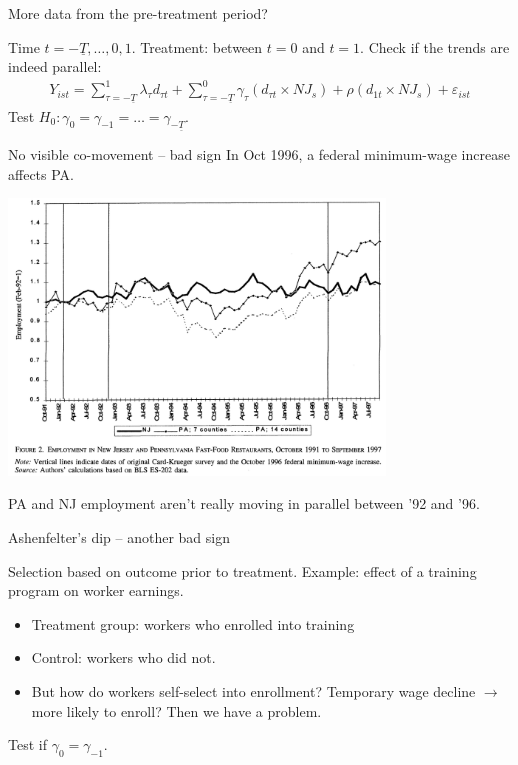\documentclass[notes=show,beamer,compress]{beamer}
\begin{document}
\begin{frame}{More data from the pre-treatment period?}

Time $t=-\underline{T},\dots,0,1$. Treatment: between $t=0$ and $t=1$. Check if the trends are indeed parallel:
\begin{align*}
Y_{ist} = \sum_{\tau=-\underline{T}}^1\lambda_\tau{}d_{\tau t} + \sum_{\tau=-\underline{T}}^0\gamma_\tau(d_{\tau t}\times{}NJ_s) + \rho (d_{1 t}\times{}NJ_s) + \varepsilon_{ist}
\end{align*}
Test $H_0: \gamma_0 = \gamma_{-1} = \dots = \gamma_{-\underline{T}}$.
\end{frame}

\begin{frame}{No visible co-movement -- bad sign}
In Oct 1996, a federal minimum-wage increase affects PA.
\begin{center}
\includegraphics[width=0.75\textwidth]{graphs/card-krueger2000.png}
\end{center}
PA and NJ employment aren't really moving in parallel between '92 and '96.
\end{frame}

\begin{frame}{Ashenfelter's dip -- another bad sign}

Selection based on outcome prior to treatment. Example: effect of a training program on worker earnings. 
\begin{itemize}
	\item{Treatment group: workers who enrolled into training}
	\item{Control: workers who did not.}
	\item{But how do workers self-select into enrollment? Temporary wage decline $\to$ more likely to enroll? Then we have a problem.}
\end{itemize}
Test if $\gamma_0=\gamma_{-1}$.
\end{frame}
\end{document}
